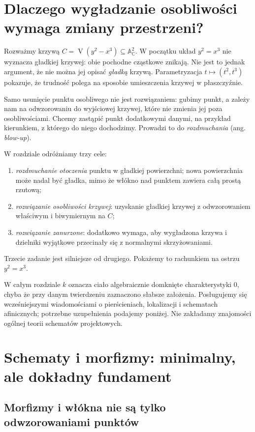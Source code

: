 \documentclass[11pt,a4paper,openany]{report}
\numberwithin{equation}{section}
\theoremstyle{plain}
\theoremstyle{definition}
\theoremstyle{remark}
\newcommand{\C}{\mathbb C}
\newcommand{\A}{\mathbb A}
\newcommand{\V}{\operatorname V}
\begin{document}
\section{Dlaczego wygładzanie osobliwości wymaga zmiany przestrzeni?}
\label{sec:ga5-motywacja}

Rozważmy krzywą $C=\V(y^2-x^3)\subseteq\A^2_\C$. W początku układ
$y^2=x^3$ nie wyznacza gładkiej krzywej: obie pochodne cząstkowe
znikają. Nie jest to jednak argument, że nie można jej opisać
\emph{gładką} krzywą. Parametryzacja $t\mapsto(t^2,t^3)$ pokazuje, że
trudność polega na sposobie umieszczenia krzywej w płaszczyźnie.

Samo usunięcie punktu osobliwego nie jest rozwiązaniem: gubimy punkt,
a zależy nam na odwzorowaniu do wyjściowej krzywej, które nie zmienia
jej poza osobliwościami. Chcemy zastąpić punkt dodatkowymi danymi,
na przykład kierunkiem, z którego do niego dochodzimy. Prowadzi to
do \emph{rozdmuchania} (ang. \emph{blow-up}).

W rozdziale odróżniamy trzy cele:
\begin{enumerate}[label=\arabic*)]
\item \emph{rozdmuchanie otoczenia} punktu w gładkiej powierzchni;
      nowa powierzchnia może nadal być gładka, mimo że włókno nad
      punktem zawiera całą prostą rzutową;
\item \emph{rozwiązanie osobliwości krzywej}: uzyskanie gładkiej
      krzywej z odwzorowaniem właściwym i biwymiernym na $C$;
\item \emph{rozwiązanie zanurzone}: dodatkowo wymaga, aby wygładzona
      krzywa i dzielniki wyjątkowe przecinały się z normalnymi
      skrzyżowaniami.
\end{enumerate}
Trzecie zadanie jest silniejsze od drugiego. Pokażemy to rachunkiem
na ostrzu $y^2=x^3$.

W całym rozdziale $k$ oznacza ciało algebraicznie domknięte
charakterystyki $0$, chyba że przy danym twierdzeniu zaznaczono
słabsze założenia. Posługujemy się wcześniejszymi wiadomościami
o pierścieniach, lokalizacji i schematach afinicznych; potrzebne
uzupełnienia podajemy poniżej. Nie zakładamy znajomości ogólnej
teorii schematów projektowych.

\section{Schematy i morfizmy: minimalny, ale dokładny fundament}
\label{sec:ga5-schematy}

\subsection{Morfizmy i włókna nie są tylko odwzorowaniami punktów}
\end{document}
